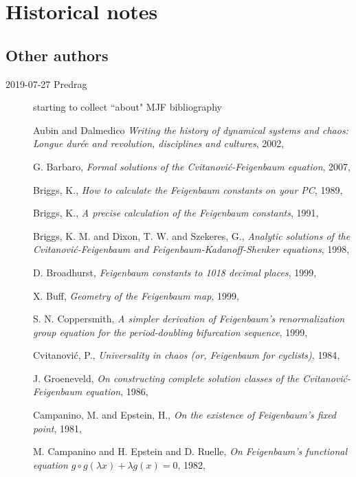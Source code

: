 

\chapter{Historical notes}
\label{c-history}

\section{Other authors}
\label{sect:Others}

\begin{description}
\item[2019-07-27 Predrag]
starting to collect ``about" MJF bibliography

Aubin and Dalmedico
{\em Writing the history of dynamical systems and chaos: {Longue}
dur{\'{e}}e and revolution, disciplines and cultures},
{2002},

{G. Barbaro},
{\em Formal solutions of the {Cvitanovi{\'c}-Feigenbaum} equation},
{2007},

{Briggs, K.},
{\em How to calculate the {Feigenbaum} constants on your {PC}},
{1989},

{Briggs, K.},
{\em A precise calculation of the {Feigenbaum} constants},
{1991},

{Briggs, K. M. and Dixon, T. W. and Szekeres, G.},
{\em Analytic solutions of the {Cvitanovi{\'c}-Feigenbaum} and {Feigenbaum-Kadanoff-Shenker} equations},
{1998},

{D. Broadhurst},
{\em Feigenbaum constants to 1018 decimal places},
{1999},

{X. Buff},
{\em Geometry of the {Feigenbaum} map},
{1999},

{S. N. Coppersmith},
{\em A simpler derivation of {Feigenbaum}'s renormalization group equation for the period-doubling bifurcation sequence},
{1999},

{Cvitanovi{\'c}, P.},
{\em Universality in chaos (or, {Feigenbaum} for cyclists)},
{1984},

{J. Groeneveld},
{\em On constructing complete solution classes of the {Cvitanovi{\'c}-Feigenbaum} equation},
{1986},

{Campanino, M. and Epstein, H.},
{\em On the existence of {Feigenbaum's} fixed point},
{1981},

{M. Campanino and H. Epstein and D. Ruelle},
{\em On {Feigenbaum}'s functional equation {$g \circ g(\lambda x) + \lambda g(x) = 0$}},
{1982},


\end{description}
